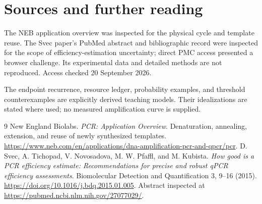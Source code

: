 \chapter*{Sources and further reading}
The NEB application overview was inspected for the physical cycle and template reuse. The Svec paper's PubMed abstract and bibliographic record were inspected for the scope of efficiency-estimation uncertainty; direct PMC access presented a browser challenge. Its experimental data and detailed methods are not reproduced. Access checked 20 September 2026.

The endpoint recurrence, resource ledger, probability examples, and threshold counterexamples are explicitly derived teaching models. Their idealizations are stated where used; no measured amplification curve is supplied.
\begingroup\let\chapter\section
\begin{thebibliography}{9}
 New England Biolabs. \emph{PCR: Application Overview}. Denaturation, annealing, extension, and reuse of newly synthesized templates. \url{https://www.neb.com/en/applications/dna-amplification-pcr-and-qpcr/pcr}.
 D. Svec, A. Tichopad, V. Novosadova, M. W. Pfaffl, and M. Kubista. \emph{How good is a PCR efficiency estimate: Recommendations for precise and robust qPCR efficiency assessments}. Biomolecular Detection and Quantification 3, 9--16 (2015). \url{https://doi.org/10.1016/j.bdq.2015.01.005}. Abstract inspected at \url{https://pubmed.ncbi.nlm.nih.gov/27077029/}.
\end{thebibliography}
\endgroup
